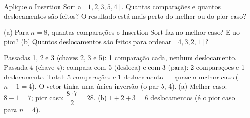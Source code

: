 \begin{exrapido}
Aplique o Insertion Sort a $[1, 2, 3, 5, 4]$. Quantas comparações e quantos deslocamentos são
feitos? O resultado está mais perto do melhor ou do pior caso?
\end{exrapido}

\begin{exrapido}
(a) Para $n = 8$, quantas comparações o Insertion Sort faz no melhor caso? E no pior?
(b) Quantos deslocamentos são feitos para ordenar $[4, 3, 2, 1]$?
\end{exrapido}

\begin{respostas}
   Passadas 1, 2 e 3 (chaves 2, 3 e 5): 1 comparação cada, nenhum deslocamento.
  Passada 4 (chave 4): compara com 5 (desloca) e com 3 (para): 2 comparações e 1 deslocamento.
  Total: 5 comparações e 1 deslocamento — quase o melhor caso ($n - 1 = 4$). O vetor tinha uma
  única inversão (o par 5, 4).
   (a) Melhor caso: $8 - 1 = 7$; pior caso: $\dfrac{8 \cdot 7}{2} = 28$.
  (b) $1 + 2 + 3 = 6$ deslocamentos (é o pior caso para $n = 4$).
\end{respostas}

